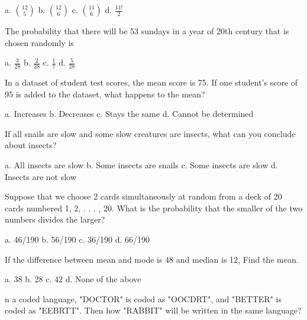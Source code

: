 \documentclass[a4paper, addpoints]{exam}
\begin{document}
\begin{questions}
	\begin{oneparcheckboxes}
		\choice a. \(\binom{12}{5}\)
		\choice b. \(\binom{12}{6}\)
		\choice c. \(\binom{11}{6}\)
		\choice d. \(\frac{11!}{2}\)
	\end{oneparcheckboxes}
	\question The probability that there will be 53 sundays in a year of 20th century that is chosen randomly is\\
	
	\begin{oneparcheckboxes}
		\choice a. \(\frac{3}{28}\)
		\choice b. \(\frac{2}{28}\)
		\choice c. \(\frac{1}{7}\)
		\choice d. \(\frac{5}{28}\)
	\end{oneparcheckboxes}
	\question In a dataset of student test scores, the mean score is 75. If one student's score of 95 is added to the dataset, what happens to the mean?\\
	
	\begin{oneparcheckboxes}
		\choice a. Increases
		\choice b. Decreases
		\choice c. Stays the same
		\choice d. Cannot be determined
	\end{oneparcheckboxes}
	\question If all snails are slow and some slow creatures are insects, what can you conclude about insects?\\
	
	\begin{oneparcheckboxes}
		\choice a. All insects are slow
		\choice b. Some insects are snails
		\choice c. Some insects are slow
		\choice d. Insects are not slow
	\end{oneparcheckboxes}
	\question Suppose that we choose 2 cards simultaneously at random from a deck of 20 cards numbered 1, 2, . . . , 20. What is the probability that the smaller of the two numbers divides the larger? \\
	
	\begin{oneparcheckboxes}
		\choice a. 46/190
		\choice b. 56/190
		\choice c. 36/190
		\choice d. 66/190
	\end{oneparcheckboxes}
	\question If the difference between mean and mode is 48 and median is 12, Find the mean.\\
	
	\begin{oneparcheckboxes}
		\choice a. 38
		\choice b. 28
		\choice c. 42
		\choice d. None of the above
	\end{oneparcheckboxes}
	\question n a coded language, "DOCTOR" is coded as "OOCDRT", and "BETTER" is coded as "EEBRTT". Then how "RABBIT" will be written in the same language?\\
	

\end{questions}
\end{document}
